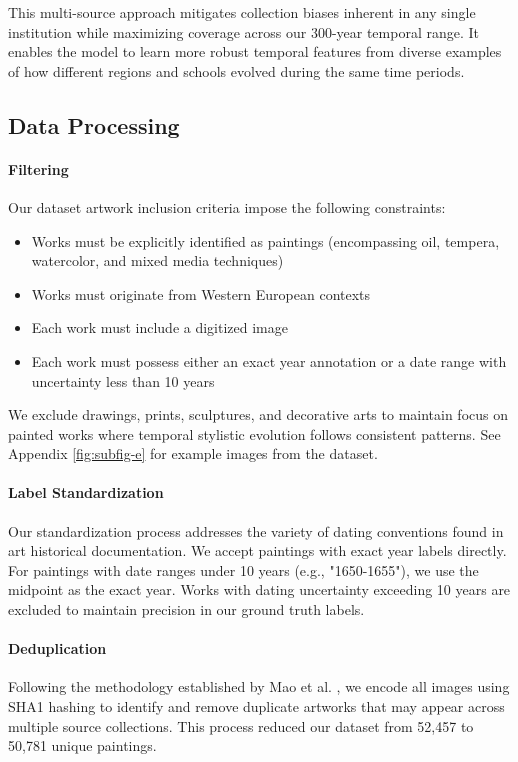 \documentclass[10pt,twocolumn,letterpaper]{article}
\begin{document}
This multi-source approach mitigates collection biases inherent in any single institution while maximizing coverage across our 300-year temporal range. It enables the model to learn more robust temporal features from diverse examples of how different regions and schools evolved during the same time periods.

\subsection{Data Processing}

\paragraph{Filtering} Our dataset artwork inclusion criteria impose the following constraints:
\begin{itemize}
    \item Works must be explicitly identified as paintings (encompassing oil, tempera, watercolor, and mixed media techniques)
    \item Works must originate from Western European contexts
    \item Each work must include a digitized image
    \item Each work must possess either an exact year annotation or a date range with uncertainty less than 10 years
\end{itemize}
We exclude drawings, prints, sculptures, and decorative arts to maintain focus on painted works where temporal stylistic evolution follows consistent patterns. See Appendix \ref{fig:subfig-e} for example images from the dataset.

\paragraph{Label Standardization} Our standardization process addresses the variety of dating conventions found in art historical documentation. We accept paintings with exact year labels directly. For paintings with date ranges under 10 years (e.g., "1650-1655"), we use the midpoint as the exact year. Works with dating uncertainty exceeding 10 years are excluded to maintain precision in our ground truth labels.

\paragraph{Deduplication} Following the methodology established by Mao et al. \cite{Mao17}, we encode all images using SHA1 hashing to identify and remove duplicate artworks that may appear across multiple source collections. This process reduced our dataset from 52,457 to 50,781 unique paintings.
\end{document}
